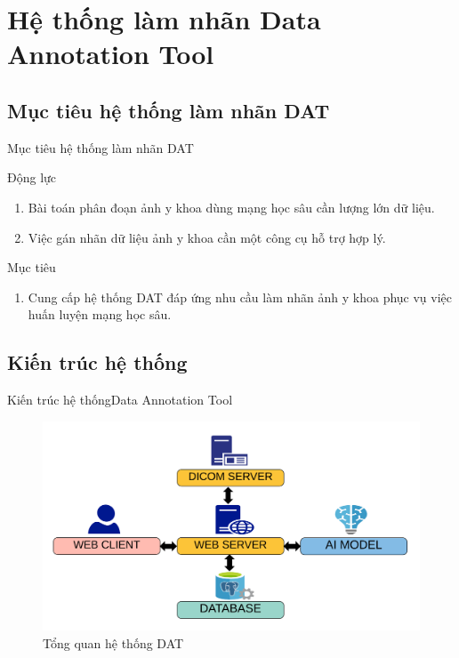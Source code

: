 \documentclass[
	10pt,                %
	aspectratio=169,     %
]{beamer}
\begin{document}
\section{Hệ thống làm nhãn Data Annotation Tool}

\subsection{Mục tiêu hệ thống làm nhãn DAT}
    \begin{frame}{Mục tiêu hệ thống làm nhãn DAT}{}
		\begin{block}{Động lực}
			\begin{enumerate}
				\item Bài toán phân đoạn ảnh y khoa dùng mạng học sâu cần lượng lớn dữ liệu. 
				\item Việc gán nhãn dữ liệu ảnh y khoa cần một công cụ hỗ trợ hợp lý.
			\end{enumerate}
		\end{block}
		
		\begin{block}{Mục tiêu}
			\begin{enumerate}
				\item Cung cấp hệ thống DAT đáp ứng nhu cầu làm nhãn ảnh y khoa phục vụ việc huấn luyện mạng học sâu. 
			\end{enumerate}
		\end{block}
	\end{frame}	
    
\subsection{Kiến trúc hệ thống}
    \begin{frame}{Kiến trúc hệ thống}{Data Annotation Tool}
		\begin{figure}
			\centering
			\includegraphics[width=0.9\linewidth]{Presentation_template/figures/DAT/mvt.pdf}
			\caption{Tổng quan hệ thống DAT}
		\end{figure}
	\end{frame}
\end{document}
